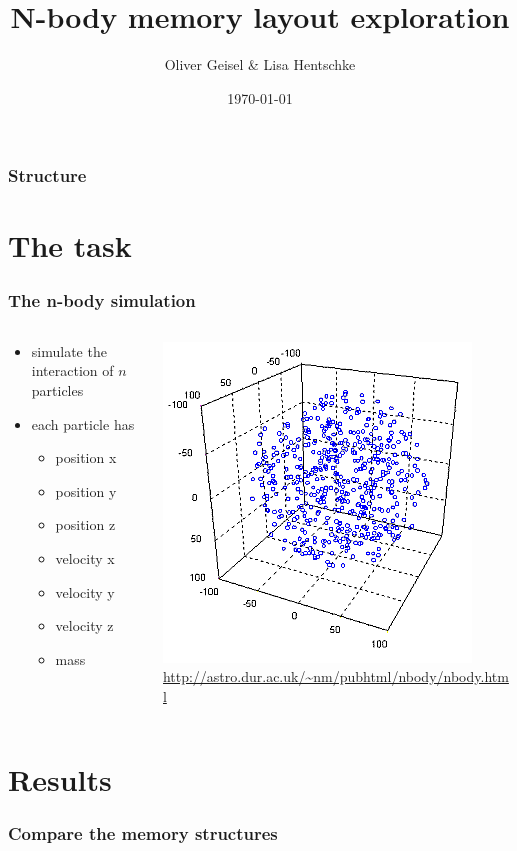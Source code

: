 \documentclass[aspectratio=169]{beamer}
\title{N-body memory layout exploration}
\author{Oliver Geisel \& Lisa Hentschke}
\date{\today}
\begin{document}
\begin{frame}
	\titlepage
\end{frame}

\begin{frame}
	\frametitle{Structure}
	\tableofcontents
\end{frame}

\section{The task} 
\begin{frame}
	\frametitle{The n-body simulation}
	\begin{columns}
	\begin{column}{0.55\textwidth}
		\begin{itemize}
			\item simulate the interaction of \(n\) particles
			\item each particle has
			\begin{itemize}
				\smallskip
				\item position x
				\item position y
				\item position z
				\smallskip
				\item velocity x
				\item velocity y
				\item velocity z
				\smallskip
				\item mass
			\end{itemize}
		\end{itemize}
	\end{column}
	
	\begin{column}{0.45\textwidth}
		\includegraphics[scale=0.65]{resources/nbody.png}
		\tiny \url{http://astro.dur.ac.uk/~nm/pubhtml/nbody/nbody.html}
	\end{column}
	
	\end{columns}
	
\end{frame}

\section{Results} 
\begin{frame}
	\frametitle{Compare the memory structures}
	
\end{frame}
\end{document}

